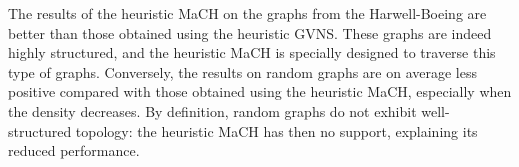 \documentclass{scrartcl}
\theoremstyle{plain}
\newcommand{\algo}{MaCH}
\newcommand{\gvns}{GVNS}
\begin{document}
\begin{table}[!ht]
\centering
\small
{}
\hspace{2cm}
	\caption{Summary of the performance of the heuristic \algo{} on the graphs 
from the Harwell-Boeing collection and on random graphs. The first two columns 
indicate the name of the collection and the number of graphs inside. The fourth 
column gives the average relative distance averaged. Detailed results are given 
in Tables~\ref{tab:harwell_perf} and \ref{tab:random_perf}.}
\end{table}

The results of the heuristic \algo{} on the graphs from the Harwell-Boeing are 
better than those obtained using the heuristic \gvns{}. These graphs are indeed 
highly structured, and the heuristic \algo{} is specially designed to traverse 
this type of graphs. Conversely, the results on random graphs are on average 
less positive compared with those obtained using the heuristic \algo{}, 
especially when the density decreases. By definition, random graphs do not 
exhibit well-structured topology: the heuristic \algo{} has then no support, 
explaining its reduced performance.
\end{document}
